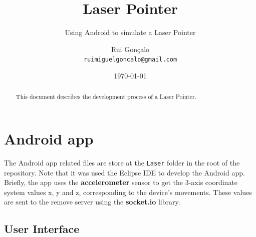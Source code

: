 \documentclass{llncs}
\begin{document}
\sloppy

\pagestyle{myheadings}

\title{Laser Pointer}
\subtitle{Using Android to simulate a Laser Pointer}
\author{Rui Gonçalo
        \\{\scriptsize \texttt{ruimiguelgoncalo@gmail.com}}
       }
\date{\today}
\maketitle


\begin{abstract}
This document describes the development process of a Laser Pointer.
\end{abstract}

\section{Android app}

The Android app related files are store at the \texttt{Laser} folder in the root of the repository. Note that it was used the Eclipse IDE to develop the Android app. Briefly, the app uses the \textbf{accelerometer} sensor to get the 3-axis coordinate system values x, y and z, corresponding to the device's movements. These values are sent to the remove server using the \textbf{socket.io} library.

\subsection{User Interface}
\end{document}
